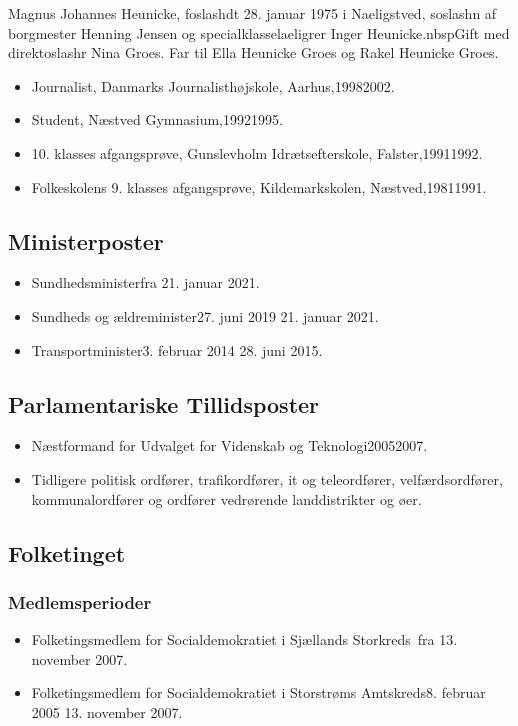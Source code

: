\documentclass[11pt, a4paper]{awesome-cv}
\begin{document}
\makecvheader[R]
\makelettertitle
\begin{cvletter}
Magnus Johannes Heunicke, foslashdt 28. januar 1975 i Naeligstved, soslashn af borgmester Henning Jensen og specialklasselaeligrer Inger Heunicke.nbspGift med direktoslashr Nina Groes. Far til Ella Heunicke Groes og Rakel Heunicke Groes.

\begin{itemize}
\item Journalist, Danmarks Journalisthøjskole, Aarhus,19982002.
\item Student, Næstved Gymnasium,19921995.
\item 10. klasses afgangsprøve, Gunslevholm Idrætsefterskole, Falster,19911992.
\item Folkeskolens 9. klasses afgangsprøve, Kildemarkskolen, Næstved,19811991.
\end{itemize}
\subsection*{Ministerposter}
\begin{itemize}
\item Sundhedsministerfra 21. januar 2021.
\item Sundheds og ældreminister27. juni 2019  21. januar 2021.
\item Transportminister3. februar 2014  28. juni 2015.
\end{itemize}
\subsection*{Parlamentariske Tillidsposter}
\begin{itemize}
\item Næstformand for Udvalget for Videnskab og Teknologi20052007.
\item Tidligere politisk ordfører, trafikordfører, it og teleordfører, velfærdsordfører, kommunalordfører og ordfører vedrørende landdistrikter og øer.
\end{itemize}
\subsection*{Folketinget}
\subsubsection*{Medlemsperioder}
\begin{itemize}
\item Folketingsmedlem for Socialdemokratiet i Sjællands Storkreds fra 13. november 2007.
\item Folketingsmedlem for Socialdemokratiet i Storstrøms Amtskreds8. februar 2005  13. november 2007.
\end{itemize}

\end{cvletter}
\end{document}
